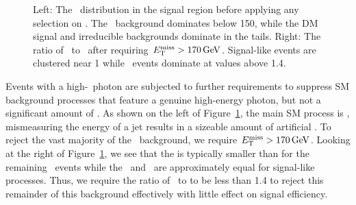 \begin{figure}[htbp]
  \centering
  \caption{
    Left: The \met\ distribution in the signal region before applying any selection on \met. 
    The \gj\ background dominates below 150\GeV, while the DM signal and irreducible backgrounds dominate in the tails.
    Right: The ratio of \ETg\ to \met\ after requiring $E_{\mathrm{T}}^{\text{miss}} > 170\,\text{Ge\hspace{-.08em}V}$.
    Signal-like events are clustered near 1 while \gj\ events dominate at values above 1.4.  
  }
  \label{fig:metcuts}
\end{figure}

Events with a high-\pt\ photon are subjected to further requirements to suppress SM background processes that feature a genuine high-energy photon, but not a significant amount of \met.
As shown on the left of Figure~\ref{fig:metcuts}, the main SM process is \gj, mismeasuring the energy of a jet results in a sizeable amount of artificial \met.
To reject the vast majority of the \gj\ background, we require $E_{\mathrm{T}}^{\text{miss}} > 170\,\text{Ge\hspace{-.08em}V}$.
Looking at the right of Figure~\ref{fig:metcuts}, we see that the \met is typically smaller than \ETg for the remaining \gj\ events while the \met\ and \ETg\ are approximately equal for signal-like processes.
Thus, we require the ratio of \ETg\ to \met to be less than 1.4 to reject this remainder of this background effectively with little effect on signal efficiency.

